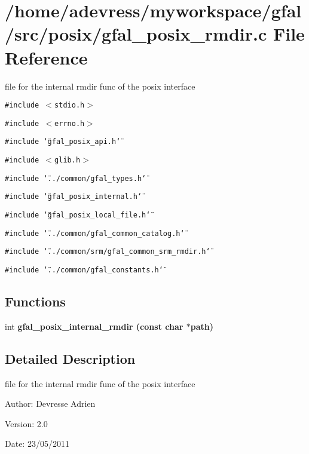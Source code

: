 \section{/home/adevress/myworkspace/gfal/src/posix/gfal\_\-posix\_\-rmdir.c File Reference}
\label{gfal__posix__rmdir_8c}
file for the internal rmdir func of the posix interface 

{\tt \#include $<$stdio.h$>$}\par
{\tt \#include $<$errno.h$>$}\par
{\tt \#include \char`\"{}gfal\_\-posix\_\-api.h\char`\"{}}\par
{\tt \#include $<$glib.h$>$}\par
{\tt \#include \char`\"{}../common/gfal\_\-types.h\char`\"{}}\par
{\tt \#include \char`\"{}gfal\_\-posix\_\-internal.h\char`\"{}}\par
{\tt \#include \char`\"{}gfal\_\-posix\_\-local\_\-file.h\char`\"{}}\par
{\tt \#include \char`\"{}../common/gfal\_\-common\_\-catalog.h\char`\"{}}\par
{\tt \#include \char`\"{}../common/srm/gfal\_\-common\_\-srm\_\-rmdir.h\char`\"{}}\par
{\tt \#include \char`\"{}../common/gfal\_\-constants.h\char`\"{}}\par
\subsection*{Functions}
\begin{CompactItemize}
\item 
int \bf{gfal\_\-posix\_\-internal\_\-rmdir} (const char $\ast$path)
\end{CompactItemize}


\subsection{Detailed Description}
file for the internal rmdir func of the posix interface 

\begin{Desc}
\item[Author:]Devresse Adrien \end{Desc}
\begin{Desc}
\item[Version:]2.0 \end{Desc}
\begin{Desc}
\item[Date:]23/05/2011 \end{Desc}


